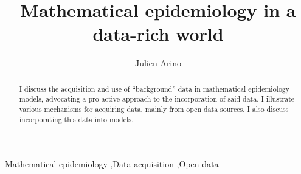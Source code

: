 \begin{frontmatter}
	
	
	
	\title{Mathematical epidemiology in a data-rich world}
	
	
	\author{Julien Arino}
	
	\address{Department of Mathematics \& Data Science NEXUS, University of Manitoba, Winnipeg, Manitoba, Canada}
	
	\begin{abstract}
		I discuss the acquisition and use of ``background'' data in mathematical epidemiology models, advocating a pro-active approach to the incorporation of said data. I illustrate various mechanisms for acquiring data, mainly from open data sources. I also discuss incorporating this data into models.
	\end{abstract}
	
	\begin{keyword}
		Mathematical epidemiology \sep Data acquisition \sep Open data
		
		
	\end{keyword}
	
\end{frontmatter}
